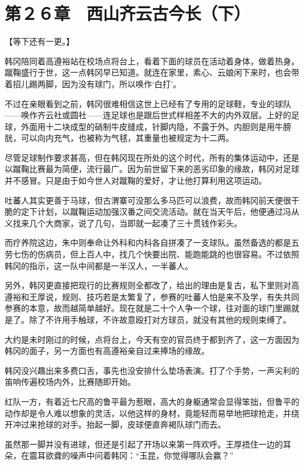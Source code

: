 \section{第２６章　西山齐云古今长（下）}

【等下还有一更。】

韩冈陪同着高遵裕站在校场点将台上，看着下面的球员在活动着身体，做着热身。蹴鞠盛行于世，这一点韩冈早已知道。就连在家里，素心、云娘闲下来时，也会带着招儿踢两脚，因为没有球门，所以唤作‘白打’。

不过在亲眼看到之前，韩冈很难相信这世上已经有了专用的足球鞋，专业的球队——唤作齐云社或圆社——连足球也是跟后世式样相差不大的内外双层。上好的足球，外面用十二块成型的硝制牛皮缝成，针脚内隐，不露于外。内胆则是用牛膀胱，可以向内充气，也被称为气毬，其重量也被规定为十二两。

尽管足球制作要求甚高，但在韩冈现在所处的这个时代，所有的集体运动中，还是以蹴鞠比赛最为简便，流行最广。因为前世留下来的恶劣印象的缘故，韩冈对足球并不感冒。只是由于如今世人对蹴鞠的爱好，才让他打算利用这项运动。

吐蕃人其实更善于马球，但古渭寨可没那么多马匹可以浪费，故而韩冈前天便很干脆的定下计划，以蹴鞠运动加强汉番之间交流活动。就在当天午后，他便通过冯从义找来几个大商家，说了几句，当即就一起凑了三十贯钱作彩头。

而疗养院这边，朱中则奉命让外科和内科各自拼凑了一支球队。虽然备选的都是五劳七伤的伤病员，但上百人中，找几个快要出院、能跑能跳的也很容易。不过依照韩冈的指示，这一队中间都是一半汉人，一半蕃人。

另外，韩冈更直接把现行的比赛规则全都改了，给出的理由是复古，私下里则对高遵裕和王厚说，规则、技巧若是太繁复了，参赛的吐蕃人怕是来不及学，有失共同参赛的本意，故而越简单越好。现在就是二十个人争一个球，往对面的球门里踢就是了。除了不许用手触球，不许故意殴打对方球员，就没有其他的规则束缚了。

大约是未时刚过的时候，点将台上，今天有空的官员终于都到齐了，这一方面因为韩冈的面子，另一方面也有高遵裕亲自过来捧场的缘故。

韩冈没兴趣出来多费口舌，事先也没安排什么垫场表演。打了个手势，一声尖利的笛响传遍校场内外，比赛随即开始。

红队一方，有着近七尺高的鲁平最为惹眼，高大的身躯通常会显得笨拙，但鲁平的动作却是令人难以想象的灵活，以他这样的身材，竟能轻而易举地把球抢走，并绕开冲过来抢球的对手。抬起一脚，皮球便直奔褐队球门而去。

虽然那一脚并没有进球，但还是引起了开场以来第一阵欢呼。王厚捂住一边的耳朵，在震耳欲聋的噪声中问着韩冈：“玉昆，你觉得哪队会赢？”

